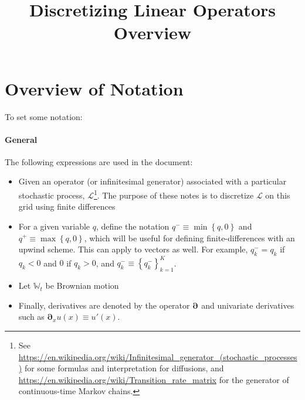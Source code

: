 \documentclass[11pt]{article}
\newcommand{\set}[1]{\ensuremath{\left\{{#1}\right\}}}
\newcommand{\D}[1][]{\ensuremath{\boldsymbol{\partial}_{#1}}}
\newcommand{\A}{\ensuremath{\mathcal{A}}}
\begin{document}
	\title{Discretizing Linear Operators Overview}
	\author{}
	\date{}
	\maketitle
	\section{Overview of Notation}
	To set some notation:
	\paragraph{General}
	
	The following expressions are used in the document:
	\begin{itemize}
		\item Given an operator (or infinitesimal generator) associated with a particular stochastic process, $\mathcal{L}$\footnote{See \url{https://en.wikipedia.org/wiki/Infinitesimal_generator_(stochastic_processes)} for some formulas and interpretation for diffusions, and \url{https://en.wikipedia.org/wiki/Transition_rate_matrix} for the generator of continuous-time Markov chains.}.  The purpose of these notes is to discretize $\mathcal{L}$ on this grid using finite differences
		\item For a given variable $q$, define the notation $q^{-} \equiv \min\set{q,0}$ and $q^{+} \equiv \max\set{q,0}$, which will be useful for defining finite-differences with an upwind scheme.  This can apply to vectors as well. For example, $q_k^{-} = q_k$ if $q_k < 0$ and $0$ if $q_k > 0$, and $q_k^{-} \equiv \set{q^{-}_k}_{k=1}^{K}$.
		\item Let $\mathbb{W}_t$ be Brownian motion
		\item Finally, derivatives are denoted by the operator $\D$ and univariate derivatives such as $\D[x]u(x) \equiv u'(x)$.
	\end{itemize}
	
\end{document}
